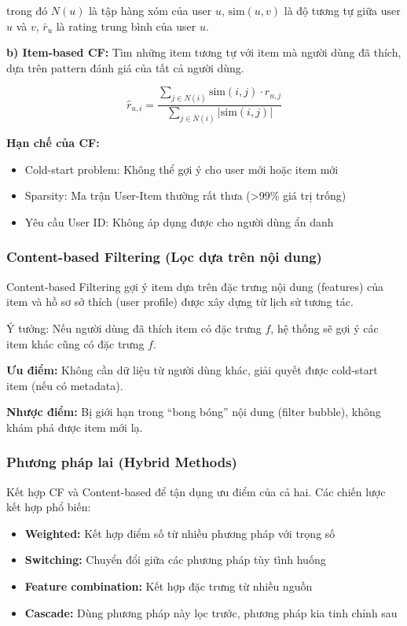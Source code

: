 \documentclass[12pt, a4paper]{article}
\begin{document}
trong đó $N(u)$ là tập hàng xóm của user $u$, $\text{sim}(u,v)$ là độ tương tự giữa user $u$ và $v$, $\bar{r}_u$ là rating trung bình của user $u$.

\textbf{b) Item-based CF:} Tìm những item tương tự với item mà người dùng đã thích, dựa trên pattern đánh giá của tất cả người dùng.

\begin{equation}
    \hat{r}_{u,i} = \frac{\sum_{j \in N(i)} \text{sim}(i,j) \cdot r_{u,j}}{\sum_{j \in N(i)} |\text{sim}(i,j)|}
    \label{eq:itemcf}
\end{equation}

\textbf{Hạn chế của CF:}
\begin{itemize}
    \item Cold-start problem: Không thể gợi ý cho user mới hoặc item mới
    \item Sparsity: Ma trận User-Item thường rất thưa (>99\% giá trị trống)
    \item Yêu cầu User ID: Không áp dụng được cho người dùng ẩn danh
\end{itemize}

\subsubsection{Content-based Filtering (Lọc dựa trên nội dung)}

Content-based Filtering gợi ý item dựa trên đặc trưng nội dung (features) của item và hồ sơ sở thích (user profile) được xây dựng từ lịch sử tương tác.

Ý tưởng: Nếu người dùng đã thích item có đặc trưng $f$, hệ thống sẽ gợi ý các item khác cũng có đặc trưng $f$.

\textbf{Ưu điểm:} Không cần dữ liệu từ người dùng khác, giải quyết được cold-start item (nếu có metadata).

\textbf{Nhược điểm:} Bị giới hạn trong ``bong bóng'' nội dung (filter bubble), không khám phá được item mới lạ.

\subsubsection{Phương pháp lai (Hybrid Methods)}

Kết hợp CF và Content-based để tận dụng ưu điểm của cả hai. Các chiến lược kết hợp phổ biến:
\begin{itemize}
    \item \textbf{Weighted:} Kết hợp điểm số từ nhiều phương pháp với trọng số
    \item \textbf{Switching:} Chuyển đổi giữa các phương pháp tùy tình huống
    \item \textbf{Feature combination:} Kết hợp đặc trưng từ nhiều nguồn
    \item \textbf{Cascade:} Dùng phương pháp này lọc trước, phương pháp kia tinh chỉnh sau
\end{itemize}
\end{document}
